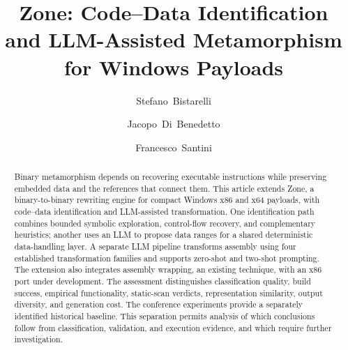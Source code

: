 \documentclass[runningheads]{llncs}
\newif\ifworkingdraft
\newcommand{\draftnote}[1]{\ifworkingdraft\par\smallskip\noindent
  {\color{draftblue}\small\textbf{Draft note.} #1}\par\smallskip\fi}
\begin{document}
\title{Zone: Code--Data Identification and LLM-Assisted Metamorphism for Windows Payloads}
\author{Stefano~Bistarelli \and
Jacopo~Di~Benedetto \and
Francesco~Santini}
\maketitle
\begin{abstract}
Binary metamorphism depends on recovering executable instructions while
preserving embedded data and the references that connect them. This article
extends Zone, a binary-to-binary rewriting engine for compact Windows x86
and x64 payloads, with code--data identification and LLM-assisted
transformation. One identification path combines bounded symbolic
exploration, control-flow recovery, and complementary heuristics; another
uses an LLM to propose data ranges for a shared deterministic data-handling
layer. A separate LLM pipeline transforms assembly using four established
transformation families and supports zero-shot and two-shot prompting.
The extension also integrates assembly wrapping, an existing technique,
with an x86 port under development. The assessment distinguishes
classification quality, build success, empirical functionality,
static-scan verdicts, representation similarity, output diversity, and
generation cost. The conference experiments provide a separately
identified historical baseline. This separation permits analysis of
which conclusions follow from classification, validation, and execution
evidence, and which require further investigation.
\end{abstract}
\draftnote{Working manuscript: extended experiments are in progress.
New numerical results remain explicitly pending. The x86 wrapping port is
development work, not a validated result. Add the principal verified
findings to this abstract before submission.}
\end{document}
